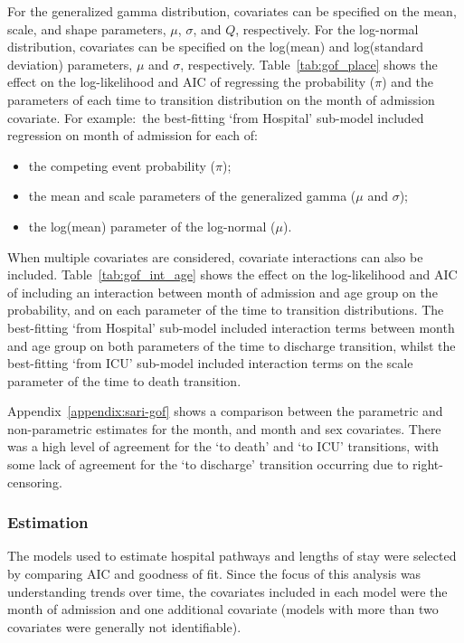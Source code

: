 For the generalized gamma distribution, covariates can be specified on the mean, scale, and shape parameters, $\mu$, $\sigma$, and $Q$, respectively. For the log-normal distribution, covariates can be specified on the log(mean) and log(standard deviation) parameters, $\mu$ and $\sigma$, respectively. Table~\ref{tab:gof_place} shows the effect on the log-likelihood and AIC of regressing the probability ($\pi$) and the parameters of each time to transition distribution on the month of admission covariate. For example:\ the best-fitting `from Hospital' sub-model included regression on month of admission for each of:
%
\begin{itemize}
    \item the competing event probability ($\pi$);
    \item the mean and scale parameters of the generalized gamma ($\mu$ and $\sigma$);
    \item the log(mean) parameter of the log-normal ($\mu$).
\end{itemize}



When multiple covariates are considered, covariate interactions can also be included. Table~\ref{tab:gof_int_age} shows the effect on the log-likelihood and AIC of including an interaction between month of admission and age group on the probability, and on each parameter of the time to transition distributions. The best-fitting `from Hospital' sub-model included interaction terms between month and age group on both parameters of the time to discharge transition, whilst the best-fitting `from ICU' sub-model included interaction terms on the scale parameter of the time to death transition.



Appendix~\ref{appendix:sari-gof} shows a comparison between the parametric and non-parametric estimates for the month, and month and sex covariates. There was a high level of agreement for the `to death' and `to ICU' transitions, with some lack of agreement for the `to discharge' transition occurring due to right-censoring.

\subsubsection{Estimation}

The models used to estimate hospital pathways and lengths of stay were selected by comparing AIC and goodness of fit. Since the focus of this analysis was understanding trends over time, the covariates included in each model were the month of admission and one additional covariate (models with more than two covariates were generally not identifiable).

